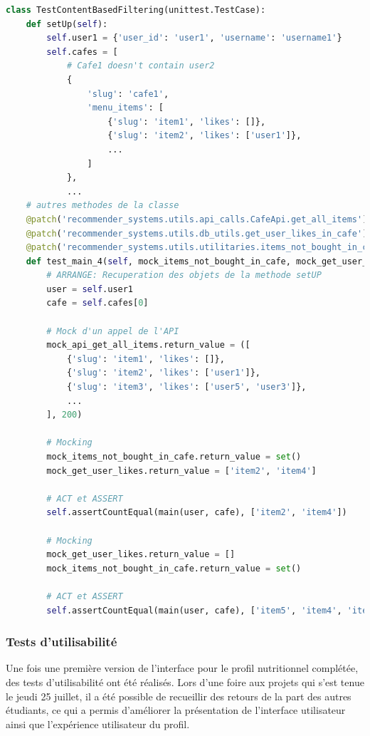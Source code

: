 \documentclass[11pt]{article}
\begin{document}
\begin{lstlisting}[language=Python, caption=Test unitaire test\_main\_4 content based filtering]
class TestContentBasedFiltering(unittest.TestCase):
    def setUp(self):
        self.user1 = {'user_id': 'user1', 'username': 'username1'}
        self.cafes = [
            # Cafe1 doesn't contain user2
            {
                'slug': 'cafe1',
                'menu_items': [
                    {'slug': 'item1', 'likes': []}, 
                    {'slug': 'item2', 'likes': ['user1']},
                    ...
                ]
            }, 
			...
    # autres methodes de la classe
    @patch('recommender_systems.utils.api_calls.CafeApi.get_all_items')
    @patch('recommender_systems.utils.db_utils.get_user_likes_in_cafe')
    @patch('recommender_systems.utils.utilitaries.items_not_bought_in_cafe')
    def test_main_4(self, mock_items_not_bought_in_cafe, mock_get_user_likes, mock_api_get_all_items):
        # ARRANGE: Recuperation des objets de la methode setUP
        user = self.user1
        cafe = self.cafes[0]

        # Mock d'un appel de l'API
        mock_api_get_all_items.return_value = ([
            {'slug': 'item1', 'likes': []}, 
            {'slug': 'item2', 'likes': ['user1']},
            {'slug': 'item3', 'likes': ['user5', 'user3']},
            ...
        ], 200)

        # Mocking
        mock_items_not_bought_in_cafe.return_value = set()
        mock_get_user_likes.return_value = ['item2', 'item4']
        
        # ACT et ASSERT
        self.assertCountEqual(main(user, cafe), ['item2', 'item4'])

        # Mocking
        mock_get_user_likes.return_value = []
        mock_items_not_bought_in_cafe.return_value = set()

        # ACT et ASSERT
        self.assertCountEqual(main(user, cafe), ['item5', 'item4', 'item3', 'item2', 'item1'])
\end{lstlisting}

\subsubsection{Tests d'utilisabilité}
Une fois une première version de l'interface pour le profil nutritionnel complétée, des tests d'utilisabilité ont été réalisés. Lors d'une foire aux projets qui s'est tenue le jeudi 25 juillet, il a été possible de recueillir des retours de la part des autres étudiants, ce qui a permis d'améliorer la présentation de l'interface utilisateur ainsi que l'expérience utilisateur du profil.\
\end{document}
